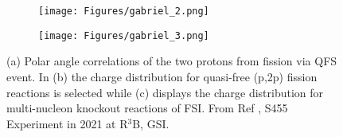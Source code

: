 \begin{description}
\begin{figure}[htpb]
\begin{subfigure}[b]{0.3\textwidth}
    \texttt{[image: Figures/gabriel\_2.png]} 
    \end{subfigure}
    \begin{subfigure}[b]{0.3\textwidth}
    \texttt{[image: Figures/gabriel\_3.png]}
    \end{subfigure}
    \caption{(a) Polar angle correlations of the two protons from fission via QFS event. In (b)  the charge distribution for quasi-free (p,2p) fission reactions is selected while (c) displays the charge distribution for multi-nucleon knockout reactions of FSI. From Ref \cite{garcia2023study}, S455 Experiment in 2021 at R$^3$B, GSI.}
    \label{fig:qfs_fission}
\end{figure}

\end{description}
